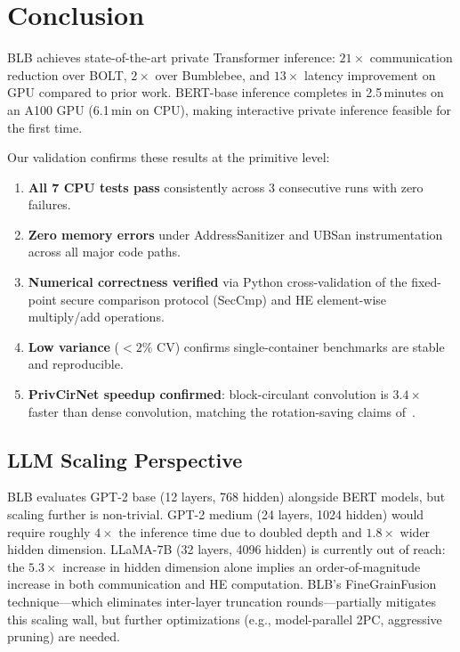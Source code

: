 \section{Conclusion}\label{sec:conclusion}

BLB achieves state-of-the-art private Transformer inference: $21\times$ communication reduction over BOLT, $2\times$ over Bumblebee, and $13\times$ latency improvement on GPU compared to prior work.
BERT-base inference completes in 2.5\,minutes on an A100 GPU (6.1\,min on CPU), making interactive private inference feasible for the first time.

Our validation confirms these results at the primitive level:
\begin{enumerate}[nosep]
  \item \textbf{All 7 CPU tests pass} consistently across 3 consecutive runs with zero failures.
  \item \textbf{Zero memory errors} under AddressSanitizer and UBSan instrumentation across all major code paths.
  \item \textbf{Numerical correctness verified} via Python cross-validation of the fixed-point secure comparison protocol (SecCmp) and HE element-wise multiply/add operations.
  \item \textbf{Low variance} ($< 2\%$ CV) confirms single-container benchmarks are stable and reproducible.
  \item \textbf{PrivCirNet speedup confirmed}: block-circulant convolution is $3.4\times$ faster than dense convolution, matching the rotation-saving claims of~\cite{xu2024privcirnet}.
\end{enumerate}

\subsection{LLM Scaling Perspective}

BLB evaluates GPT-2 base (12 layers, 768 hidden) alongside BERT models, but scaling further is non-trivial.
GPT-2 medium (24 layers, 1024 hidden) would require roughly $4\times$ the inference time due to doubled depth and $1.8\times$ wider hidden dimension.
LLaMA-7B (32 layers, 4096 hidden) is currently out of reach: the $5.3\times$ increase in hidden dimension alone implies an order-of-magnitude increase in both communication and HE computation.
BLB's FineGrainFusion technique---which eliminates inter-layer truncation rounds---partially mitigates this scaling wall, but further optimizations (e.g., model-parallel 2PC, aggressive pruning) are needed.

